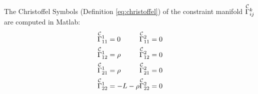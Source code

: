 \documentclass[main.tex]{subfiles}
\begin{document}
\begin{enumerate}[(1)]
    The Christoffel Symbols (Definition \ref{eq:christoffel}) of the constraint manifold $\Gammac{k}{ij}$ are computed in Matlab:
    \begin{align}
    \begin{split}
        \Gammac{1}{11}&=0\\
        \Gammac{1}{12}&=\rho\\
        \Gammac{1}{21}&=\rho\\
        \Gammac{1}{22}&=-L-\rho
    \end{split}
    \begin{split}
        \Gammac{2}{11}&=0\\
        \Gammac{2}{12}&=0\\
        \Gammac{2}{21}&=0\\
        \Gammac{2}{22}&=0
    \end{split}
    \end{align}
     
\end{enumerate}
\end{document}
